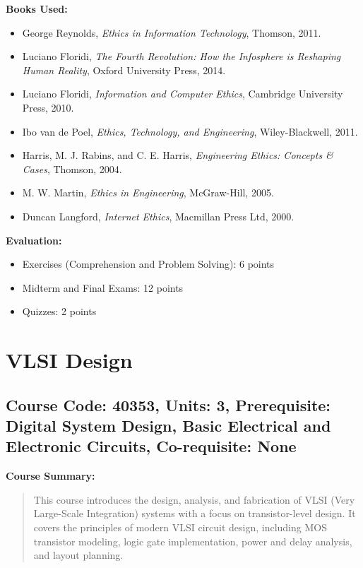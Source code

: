 \documentclass[12pt]{article}
\begin{document}
\textbf{Books Used:}
\begin{itemize}
    \item George Reynolds, \textit{Ethics in Information Technology}, Thomson, 2011.
    \item Luciano Floridi, \textit{The Fourth Revolution: How the Infosphere is Reshaping Human Reality}, Oxford University Press, 2014.
    \item Luciano Floridi, \textit{Information and Computer Ethics}, Cambridge University Press, 2010.
    \item Ibo van de Poel, \textit{Ethics, Technology, and Engineering}, Wiley-Blackwell, 2011.
    \item Harris, M. J. Rabins, and C. E. Harris, \textit{Engineering Ethics: Concepts \& Cases}, Thomson, 2004.
    \item M. W. Martin, \textit{Ethics in Engineering}, McGraw-Hill, 2005.
    \item Duncan Langford, \textit{Internet Ethics}, Macmillan Press Ltd, 2000.
\end{itemize}

\textbf{Evaluation:}
\begin{itemize}
    \item Exercises (Comprehension and Problem Solving): 6 points
    \item Midterm and Final Exams: 12 points
    \item Quizzes: 2 points
\end{itemize}

\newpage

\section{VLSI Design}
\subsection*{Course Code: 40353, Units: 3, Prerequisite: Digital System Design, Basic Electrical and Electronic Circuits, Co-requisite: None}

\textbf{Course Summary:} 
\begin{quote}
This course introduces the design, analysis, and fabrication of VLSI (Very Large-Scale Integration) systems with a focus on transistor-level design. It covers the principles of modern VLSI circuit design, including MOS transistor modeling, logic gate implementation, power and delay analysis, and layout planning.
\end{quote}
\end{document}

